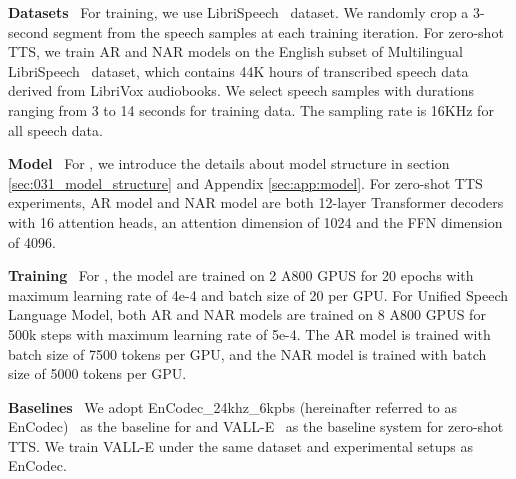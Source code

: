 \textbf{Datasets}~
For \method training, we use LibriSpeech~\citep{librispeech} dataset. 
We randomly crop a 3-second segment from the speech samples at each training iteration. For zero-shot TTS, we train AR and NAR models on the English subset of Multilingual LibriSpeech~\citep{Pratap_2020} dataset, which contains 44K hours of transcribed speech data derived from LibriVox audiobooks. We select speech samples with durations ranging from 3 to 14 seconds for training data. The sampling rate is 16KHz for all speech data.

\textbf{Model}~
For \method, we introduce the details about model structure in section \ref{sec:031_model_structure} and Appendix \ref{sec:app:model}.
For zero-shot TTS experiments, 
AR model and NAR model are both
12-layer Transformer decoders with 16 attention heads, an attention dimension of 1024 and the FFN dimension of 4096.

\textbf{Training}~
For \method, the model are trained on 2 A800 GPUS for 20 epochs with maximum learning rate of 4e-4 and batch size of 20 per GPU.
For Unified Speech Language Model, both AR and NAR models are trained on 8 A800 GPUS for 500k steps with maximum learning rate of 5e-4. The AR model is trained with batch size of 7500 tokens per GPU, and the NAR model is trained with batch size of 5000 tokens per GPU.

\textbf{Baselines}~
We adopt EnCodec\_24khz\_6kpbs (hereinafter referred to as EnCodec)~\citep{défossez2022high} as the baseline for \method and VALL-E~\citep{wang2023neural} as the baseline system for zero-shot TTS. We train VALL-E under the same dataset and experimental setups as EnCodec.
